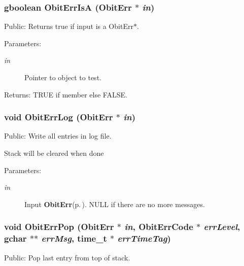 \subsubsection{\setlength{\rightskip}{0pt plus 5cm}gboolean Obit\-Err\-Is\-A ({\bf Obit\-Err} $\ast$ {\em in})}\label{ObitErr_8h_a26}


Public: Returns true if input is a Obit\-Err$\ast$. 

\begin{Desc}
\item[Parameters:]
\begin{description}
\item[{\em in}]Pointer to object to test. \end{description}
\end{Desc}
\begin{Desc}
\item[Returns:]TRUE if member else FALSE. \end{Desc}
\subsubsection{\setlength{\rightskip}{0pt plus 5cm}void Obit\-Err\-Log ({\bf Obit\-Err} $\ast$ {\em in})}\label{ObitErr_8h_a23}


Public: Write all entries in log file. 

Stack will be cleared when done \begin{Desc}
\item[Parameters:]
\begin{description}
\item[{\em in}]Input {\bf Obit\-Err}{\rm (p.\,\pageref{structObitErr})}. NULL if there are no more messages. \end{description}
\end{Desc}
\subsubsection{\setlength{\rightskip}{0pt plus 5cm}void Obit\-Err\-Pop ({\bf Obit\-Err} $\ast$ {\em in}, {\bf Obit\-Err\-Code} $\ast$ {\em err\-Level}, gchar $\ast$$\ast$ {\em err\-Msg}, time\_\-t $\ast$ {\em err\-Time\-Tag})}\label{ObitErr_8h_a22}


Public: Pop last entry from top of stack. 

